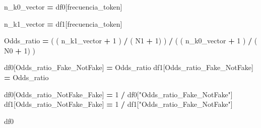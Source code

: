 \documentclass[
  11pt,
  a4paper,
]{article}
\newenvironment{Shaded}{\begin{snugshade}}{\end{snugshade}}
\newcommand{\DecValTok}[1]{\textcolor[rgb]{0.00,0.00,0.81}{#1}}
\newcommand{\NormalTok}[1]{#1}
\newcommand{\OperatorTok}[1]{\textcolor[rgb]{0.81,0.36,0.00}{\textbf{#1}}}
\newcommand{\StringTok}[1]{\textcolor[rgb]{0.31,0.60,0.02}{#1}}
\begin{document}
\begin{Shaded}
\begin{Highlighting}[]

\NormalTok{n\_k0\_vector }\OperatorTok{=}\NormalTok{ df0[}\StringTok{\textquotesingle{}frecuencia\_token\textquotesingle{}}\NormalTok{]}

\NormalTok{n\_k1\_vector }\OperatorTok{=}\NormalTok{ df1[}\StringTok{\textquotesingle{}frecuencia\_token\textquotesingle{}}\NormalTok{]}


\NormalTok{Odds\_ratio }\OperatorTok{=}\NormalTok{ ( ( n\_k1\_vector }\OperatorTok{+} \DecValTok{1}\NormalTok{ ) }\OperatorTok{/}\NormalTok{ ( N1 }\OperatorTok{+} \DecValTok{1}\NormalTok{) ) }\OperatorTok{/}\NormalTok{ ( ( n\_k0\_vector }\OperatorTok{+} \DecValTok{1}\NormalTok{ ) }\OperatorTok{/}\NormalTok{ ( N0 }\OperatorTok{+} \DecValTok{1}\NormalTok{) )}
\end{Highlighting}
\end{Shaded}

\begin{Shaded}
\begin{Highlighting}[]
\NormalTok{df0[}\StringTok{\textquotesingle{}Odds\_ratio\_Fake\_NotFake\textquotesingle{}}\NormalTok{] }\OperatorTok{=}\NormalTok{ Odds\_ratio  }
\NormalTok{df1[}\StringTok{\textquotesingle{}Odds\_ratio\_Fake\_NotFake\textquotesingle{}}\NormalTok{] }\OperatorTok{=}\NormalTok{ Odds\_ratio  }

\NormalTok{df0[}\StringTok{\textquotesingle{}Odds\_ratio\_NotFake\_Fake\textquotesingle{}}\NormalTok{] }\OperatorTok{=} \DecValTok{1} \OperatorTok{/}\NormalTok{ df0[}\StringTok{"Odds\_ratio\_Fake\_NotFake"}\NormalTok{] }
\NormalTok{df1[}\StringTok{\textquotesingle{}Odds\_ratio\_NotFake\_Fake\textquotesingle{}}\NormalTok{] }\OperatorTok{=} \DecValTok{1} \OperatorTok{/}\NormalTok{ df1[}\StringTok{"Odds\_ratio\_Fake\_NotFake"}\NormalTok{]  }
\end{Highlighting}
\end{Shaded}

\begin{Shaded}
\begin{Highlighting}[]
\NormalTok{df0}
\end{Highlighting}
\end{Shaded}
\end{document}
